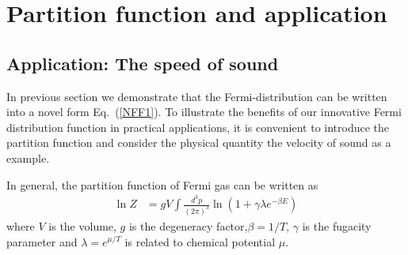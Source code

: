 \documentclass[sn-mathphys,Numbered]{sn-jnl}
\theoremstyle{thmstyleone}%
\theoremstyle{thmstyletwo}%
\theoremstyle{thmstylethree}%
\begin{document}

\section{Partition function and application}\label{NumericalResult}
\subsection{Application: The speed of sound}

In previous section we demonstrate that the Fermi-distribution can be written into a novel form Eq.~(\ref{NFF1}). To illustrate the benefits of our innovative Fermi distribution function in practical applications, it is convenient to introduce the partition function and consider the physical quantity the velocity of sound as a example.

In general, the partition function of Fermi gas can be written as
\cite{letessier_rafelski_2023}
\begin{align}
\ln{Z}&={gV}\int \frac{d^3p}{(2\pi)^3}\ln(1+\gamma\lambda e^{-\beta E})
\end{align}
where $V$ is the volume, $g$ is the degeneracy factor,$\beta=1/T$,  $\gamma$ is the fugacity parameter and $\lambda=e^{\mu/T}$ is related to chemical potential $\mu$. 
\end{document}
